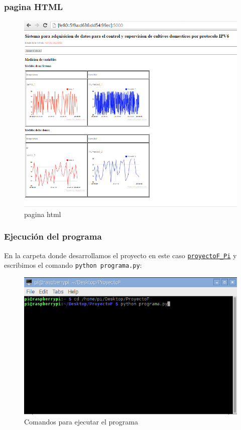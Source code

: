 \documentclass[10pt]{beamer}\usepackage[]{graphicx}\usepackage[]{color}
\begin{document}
\begin{frame}
\frametitle{pagina HTML}
		\begin{figure}[H] 
			\centering
			\includegraphics[scale=0.3]{html3}  
			\caption{pagina html}	
		\end{figure}
\end{frame}

\begin{frame}
	\frametitle{Ejecución del programa}
En la carpeta donde desarrollamos el proyecto en este caso \href{https://github.com/wilrilo/repo_final_nube/tree/master/repo_final_nube/ProyectoF_Pi}{\texttt{proyectoF\_Pi}} y escribimos el comando \texttt{python programa.py}:
\begin{figure}[H] 
	\centering
	\includegraphics[scale=0.3]{eje1}  
	\caption{Comandos para ejecutar el programa}	
\end{figure}
\end{frame}
\end{document}
